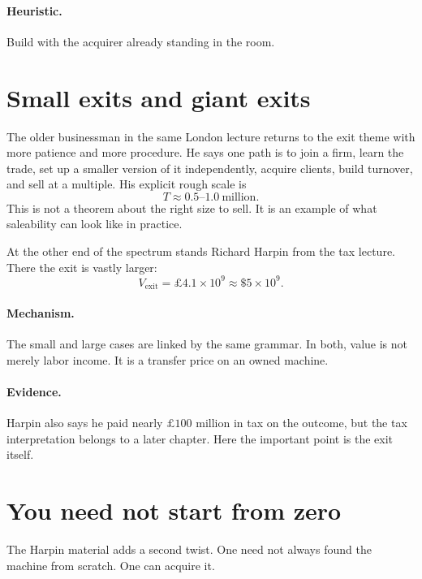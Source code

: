 \documentclass[11pt,oneside]{book}
\begin{document}
\paragraph{Heuristic.} Build with the acquirer already standing in the room.

\section{Small exits and giant exits}

The older businessman in the same London lecture returns to the exit theme with more patience and more procedure. He says one path is to join a firm, learn the trade, set up a smaller version of it independently, acquire clients, build turnover, and sell at a multiple. His explicit rough scale is
\begin{equation}
T \approx 0.5\text{--}1.0\ \text{million}.
\end{equation}
This is not a theorem about the right size to sell. It is an example of what saleability can look like in practice.

At the other end of the spectrum stands Richard Harpin from the tax lecture. There the exit is vastly larger:
\begin{equation}
V_{\mathrm{exit}} = \pounds 4.1\times 10^{9} \approx \$5\times 10^{9}.
\end{equation}

\paragraph{Mechanism.} The small and large cases are linked by the same grammar. In both, value is not merely labor income. It is a transfer price on an owned machine.

\paragraph{Evidence.} Harpin also says he paid nearly \(\pounds 100\) million in tax on the outcome, but the tax interpretation belongs to a later chapter. Here the important point is the exit itself.

\section{You need not start from zero}

The Harpin material adds a second twist. One need not always found the machine from scratch. One can acquire it.
\end{document}

